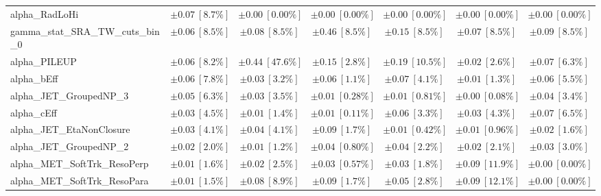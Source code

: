 \begin{sidewaystable}
\begin{center}
\begin{tabular*}{\textwidth}{@{\extracolsep{\fill}}lcccccc}
alpha\_RadLoHi         & $\pm 0.07\ [8.7\%] $          & $\pm 0.00\ [0.00\%] $          & $\pm 0.00\ [0.00\%] $          & $\pm 0.00\ [0.00\%] $          & $\pm 0.00\ [0.00\%] $          & $\pm 0.00\ [0.00\%] $       \\
gamma\_stat\_SRA\_TW\_cuts\_bin\_0         & $\pm 0.06\ [8.5\%] $          & $\pm 0.08\ [8.5\%] $          & $\pm 0.46\ [8.5\%] $          & $\pm 0.15\ [8.5\%] $          & $\pm 0.07\ [8.5\%] $          & $\pm 0.09\ [8.5\%] $       \\
alpha\_PILEUP         & $\pm 0.06\ [8.2\%] $          & $\pm 0.44\ [47.6\%] $          & $\pm 0.15\ [2.8\%] $          & $\pm 0.19\ [10.5\%] $          & $\pm 0.02\ [2.6\%] $          & $\pm 0.07\ [6.3\%] $       \\
alpha\_bEff         & $\pm 0.06\ [7.8\%] $          & $\pm 0.03\ [3.2\%] $          & $\pm 0.06\ [1.1\%] $          & $\pm 0.07\ [4.1\%] $          & $\pm 0.01\ [1.3\%] $          & $\pm 0.06\ [5.5\%] $       \\
alpha\_JET\_GroupedNP\_3         & $\pm 0.05\ [6.3\%] $          & $\pm 0.03\ [3.5\%] $          & $\pm 0.01\ [0.28\%] $          & $\pm 0.01\ [0.81\%] $          & $\pm 0.00\ [0.08\%] $          & $\pm 0.04\ [3.4\%] $       \\
alpha\_cEff         & $\pm 0.03\ [4.5\%] $          & $\pm 0.01\ [1.4\%] $          & $\pm 0.01\ [0.11\%] $          & $\pm 0.06\ [3.3\%] $          & $\pm 0.03\ [4.3\%] $          & $\pm 0.07\ [6.5\%] $       \\
alpha\_JET\_EtaNonClosure         & $\pm 0.03\ [4.1\%] $          & $\pm 0.04\ [4.1\%] $          & $\pm 0.09\ [1.7\%] $          & $\pm 0.01\ [0.42\%] $          & $\pm 0.01\ [0.96\%] $          & $\pm 0.02\ [1.6\%] $       \\
alpha\_JET\_GroupedNP\_2         & $\pm 0.02\ [2.0\%] $          & $\pm 0.01\ [1.2\%] $          & $\pm 0.04\ [0.80\%] $          & $\pm 0.04\ [2.2\%] $          & $\pm 0.02\ [2.1\%] $          & $\pm 0.03\ [3.0\%] $       \\
alpha\_MET\_SoftTrk\_ResoPerp         & $\pm 0.01\ [1.6\%] $          & $\pm 0.02\ [2.5\%] $          & $\pm 0.03\ [0.57\%] $          & $\pm 0.03\ [1.8\%] $          & $\pm 0.09\ [11.9\%] $          & $\pm 0.00\ [0.00\%] $       \\
alpha\_MET\_SoftTrk\_ResoPara         & $\pm 0.01\ [1.5\%] $          & $\pm 0.08\ [8.9\%] $          & $\pm 0.09\ [1.7\%] $          & $\pm 0.05\ [2.8\%] $          & $\pm 0.09\ [12.1\%] $          & $\pm 0.00\ [0.00\%] $       \\

\end{tabular*}
\end{center}
\end{sidewaystable}
